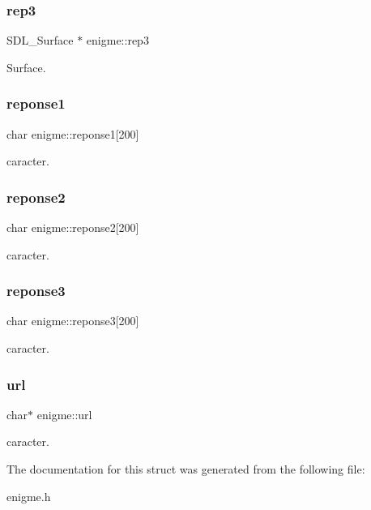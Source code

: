 \subsubsection{\texorpdfstring{rep3}{rep3}}
{\footnotesize\ttfamily S\+D\+L\+\_\+\+Surface $\ast$ enigme\+::rep3}

Surface. \mbox{\label{structenigme_a1d31bead9270c4be04f410820b285ade}} 
\subsubsection{\texorpdfstring{reponse1}{reponse1}}
{\footnotesize\ttfamily char enigme\+::reponse1\mbox{[}200\mbox{]}}

caracter. \mbox{\label{structenigme_a97f9390bd04fc83a0a7a84f3bf03464d}} 
\subsubsection{\texorpdfstring{reponse2}{reponse2}}
{\footnotesize\ttfamily char enigme\+::reponse2\mbox{[}200\mbox{]}}

caracter. \mbox{\label{structenigme_ad7f3c27ab2d1e20502ee3a39040c99f3}} 
\subsubsection{\texorpdfstring{reponse3}{reponse3}}
{\footnotesize\ttfamily char enigme\+::reponse3\mbox{[}200\mbox{]}}

caracter. \mbox{\label{structenigme_a517b1827214ab22f8641f6393d3dbbaf}} 
\subsubsection{\texorpdfstring{url}{url}}
{\footnotesize\ttfamily char$\ast$ enigme\+::url}

caracter. 

The documentation for this struct was generated from the following file\+:\begin{DoxyCompactItemize}
\item 
enigme.\+h\end{DoxyCompactItemize}
